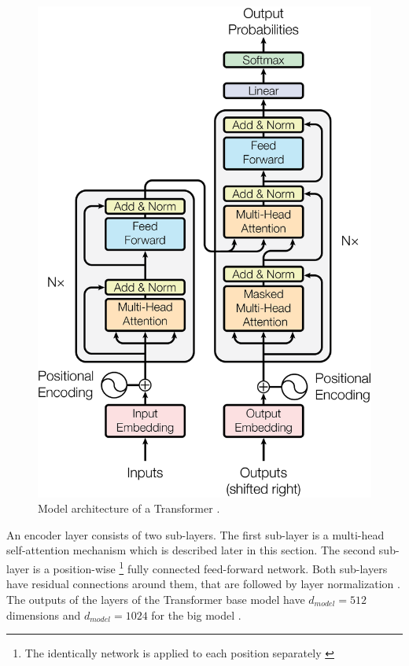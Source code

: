 \begin{figure}[h]
\centering
\includegraphics{figures/transformer-model}
\caption[Model architecture of a Transformer]{Model architecture of a Transformer \cite[p.~3]{1706.03762}.}
\label{fig:transformer-model}
\end{figure}

An encoder layer consists of two sub-layers.
The first sub-layer is a multi-head self-attention mechanism which is described later in this section.
The second sub-layer is a position-wise \footnote{The identically network is applied to each position separately \cite[p.~5]{1706.03762}} fully connected feed-forward network.
Both sub-layers have residual connections \cite{1512.03385} around them, that are followed by layer normalization \cite{1607.06450}.
The outputs of the layers of the Transformer base model have $d_{model}=512$ dimensions and $d_{model}=1024$ for the big model \cite[p.~9]{1706.03762}.

